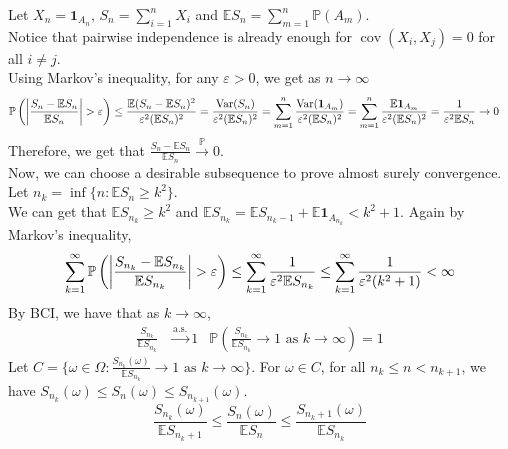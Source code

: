 \documentclass{huhtakm-template-book}
\newcommand{\prob}{\mathbb{P}}
\newcommand{\expect}{\mathbb{E}}
\DeclareMathOperator{\Var}{Var}
\DeclareMathOperator{\cov}{cov}
\begin{document}
\begin{proofing}
    Let $X_{n}=\mathbf{1}_{A_{n}}$, $S_{n}=\sum_{i=1}^{n}X_{i}$ and $\expect S_{n}=\sum_{m=1}^{n}\prob(A_{m})$.\\
    Notice that pairwise independence is already enough for $\cov(X_{i},X_{j})=0$ for all $i\neq j$.\\
    Using Markov's inequality, for any $\varepsilon>0$, we get as $n\to\infty$
    \begin{align*}
        \prob\left(\abs{\frac{S_{n}-\expect S_{n}}{\expect S_{n}}}>\varepsilon\right)&\leq\frac{\expect(S_{n}-\expect S_{n})^{2}}{\varepsilon^{2}(\expect S_{n})^{2}}=\frac{\Var(S_{n})}{\varepsilon^{2}(\expect S_{n})^{2}}=\sum_{m=1}^{n}\frac{\Var(\mathbf{1}_{A_{m}})}{\varepsilon^{2}(\expect S_{n})^{2}}=\sum_{m=1}^{n}\frac{\expect\mathbf{1}_{A_{m}}}{\varepsilon^{2}(\expect S_{n})^{2}}=\frac{1}{\varepsilon^{2}\expect S_{n}}\to 0
    \end{align*}
    Therefore, we get that $\frac{S_{n}-\expect S_{n}}{\expect S_{n}}\xrightarrow{\prob}0$.\\
    Now, we can choose a desirable subsequence to prove almost surely convergence. Let $n_{k}=\inf\{n:\expect S_{n}\geq k^{2}\}$.\\
    We can get that $\expect S_{n_{k}}\geq k^{2}$ and $\expect S_{n_{k}}=\expect S_{n_{k}-1}+\expect\mathbf{1}_{A_{n_{k}}}<k^{2}+1$. Again by Markov's inequality,
    \begin{equation*}
        \sum_{k=1}^{\infty}\prob\left(\abs{\frac{S_{n_{k}}-\expect S_{n_{k}}}{\expect S_{n_{k}}}}>\varepsilon\right)\leq\sum_{k=1}^{\infty}\frac{1}{\varepsilon^{2}\expect S_{n_{k}}}\leq\sum_{k=1}^{\infty}\frac{1}{\varepsilon^{2}(k^{2}+1)}<\infty
    \end{equation*}
    By BCI, we have that as $k\to\infty$,
    \begin{align*}
        \frac{S_{n_{k}}}{\expect S_{n_{k}}}&\xrightarrow{\text{a.s.}}1 & \prob\left(\frac{S_{n_{k}}}{\expect S_{n_{k}}}\to 1\text{ as }k\to\infty\right)=1
    \end{align*}
    Let $C=\{\omega\in\Omega:\frac{S_{n_{k}}(\omega)}{\expect S_{n_{k}}}\to 1\text{ as }k\to\infty\}$. For $\omega\in C$, for all $n_{k}\leq n<n_{k+1}$, we have $S_{n_{k}}(\omega)\leq S_{n}(\omega)\leq S_{n_{k+1}}(\omega)$.
    \begin{equation*}
        \frac{S_{n_{k}}(\omega)}{\expect S_{n_{k}+1}}\leq\frac{S_{n}(\omega)}{\expect S_{n}}\leq\frac{S_{n_{k}+1}(\omega)}{\expect S_{n_{k}}}
    \end{equation*}

\end{proofing}
\end{document}
